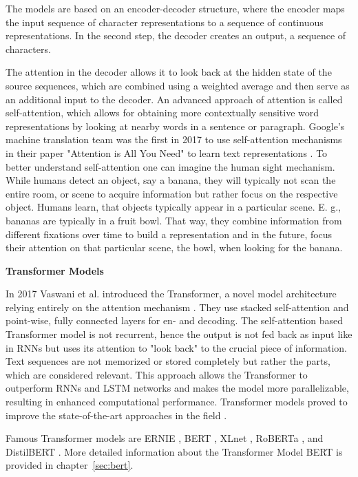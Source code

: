 The models are based on an encoder-decoder structure, where the encoder maps the input sequence of character representations to a sequence of continuous representations. In the second step, the decoder creates an output, a sequence of characters. 

The attention in the decoder allows it to look back at the hidden state of the source sequences, which are combined using a weighted average and then serve as an additional input to the decoder. 
An advanced approach of attention is called self-attention, which allows for obtaining more contextually sensitive word representations by looking at nearby words in a sentence or paragraph. Google's machine translation team was the first in 2017 to use self-attention mechanisms in their paper "Attention is All You Need" to learn text representations \cite{vaswani2017attention}. To better understand self-attention one can imagine the human sight mechanism. While humans detect an object, say a banana, they will typically not scan the entire room, or scene to acquire information but rather focus on the respective object. Humans learn, that objects typically appear in a particular scene. E. g., bananas are typically in a fruit bowl. That way, they combine information from different fixations over time to build a representation and in the future, focus their attention on that particular scene, the bowl, when looking for the banana. 



\textbf{Transformer Models}
\label{sec:transformers}

In 2017 Vaswani et al. introduced the Transformer, a novel model architecture relying entirely on the attention mechanism \cite{vaswani2017attention}. They use stacked self-attention and point-wise, fully connected layers for en- and decoding. 
The self-attention based Transformer model is not recurrent, hence the output is not fed back as input like in RNNs but uses its attention to "look back" to the crucial piece of information. Text sequences are not memorized or stored completely but rather the parts, which are considered relevant. This approach allows the Transformer to outperform RNNs and LSTM networks and makes the model more parallelizable, resulting in enhanced computational performance. Transformer models proved to improve the state-of-the-art approaches in the field \cite{vaswani2017attention}. 

Famous Transformer models are ERNIE \cite{zhang2019ernie}, BERT \cite{devlin2018bert}, XLnet \cite{yang2019xlnet}, RoBERTa \cite{liu2019roberta}, and DistilBERT \cite{sanh2019distilbert}. More detailed information about the Transformer Model BERT is provided in chapter~\ref{sec:bert}.

